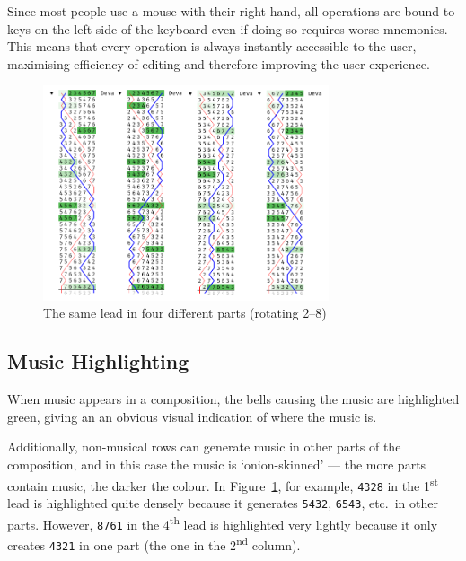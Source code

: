 \documentclass[12pt]{article}
\newcommand{\row}[1]{\texttt{#1}}
\newcommand{\nth}[2]{#1\textsuperscript{#2}}
\begin{document}
Since most people use a mouse with their right hand, all operations are bound to keys on the left
side of the keyboard even if doing so requires worse mnemonics.  This means that every operation is
always instantly accessible to the user, maximising efficiency of editing and therefore improving
the user experience.

\begin{figure}
    \centering
    \includegraphics[width=0.75\textwidth]{multi-part-music-clean}
    \caption{The same lead in four different parts (rotating 2--8)}\label{fig:multi-part-music}
\end{figure}

\subsection{Music Highlighting}

When music appears in a composition, the bells causing the music are highlighted green, giving an
an obvious visual indication of where the music is.

Additionally, non-musical rows can generate music in other parts of the composition, and in this
case the music is `onion-skinned' --- the more parts contain music, the darker the colour.  In
Figure~\ref{fig:multi-part-music}, for example, \row{4328} in the \nth{1}{st} lead is highlighted quite
densely because it generates \row{5432}, \row{6543}, etc.\ in other parts.  However, \row{8761} in
the \nth{4}{th} lead is highlighted very lightly because it only creates \row{4321} in one part
(the one in the \nth{2}{nd} column).
\end{document}
